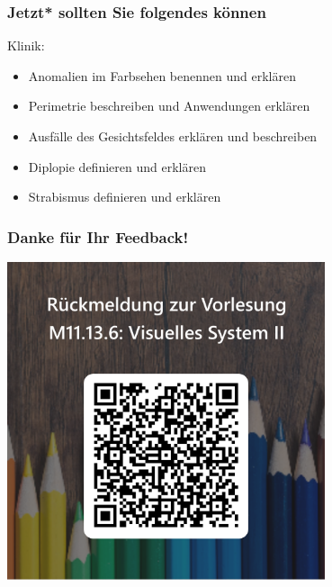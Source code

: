 \documentclass{beamer}
\begin{document}
\begin{frame}

 \frametitle{Jetzt* sollten Sie folgendes können}

 

\begin{block}{Klinik:}

\begin{itemize}
    
\item 
Anomalien im Farbsehen benennen und erklären
    \item 
Perimetrie beschreiben und Anwendungen erklären
    \item 
Ausfälle des Gesichtsfeldes erklären und beschreiben
    \item 
Diplopie definieren und erklären
    \item 
Strabismus definieren und erklären

\end{itemize}


\end{block}



\end{frame}





\begin{frame}
\frametitle{Danke für Ihr Feedback!}


\begin{center}
\includegraphics[width=0.7\textwidth]{feedback_QR.png}
\end{center}
\end{frame}
\end{document}
